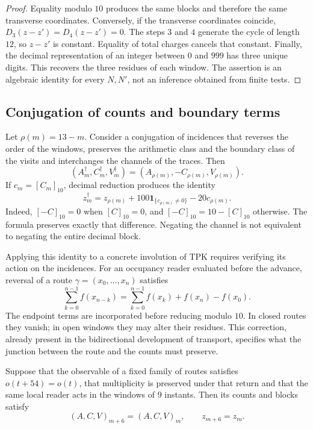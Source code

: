 \begin{proof}
Equality modulo \(10\) produces the same blocks and therefore
the same transverse coordinates. Conversely, if the transverse
coordinates coincide, \(D_3(z-z')=D_4(z-z')=0\). The steps
\(3\) and \(4\) generate the cycle of length \(12\), so
\(z-z'\) is constant. Equality of total charges cancels that
constant. Finally, the decimal representation of an integer between
\(0\) and \(999\) has three unique digits. This recovers the
three residues of each window. The assertion is an algebraic identity
for every \(N,N'\), not an inference obtained from finite tests.
\end{proof}

\subsection{Conjugation of counts and boundary terms}
\label{x_reciprocidad:subsec:registro-conjugacion-incidencial}

Let \(\rho(m)=13-m\). Consider a conjugation of incidences
that reverses the order of the windows, preserves the arithmetic class and the
boundary class of the visits and interchanges the channels of the traces.
Then
\[
 (A_m^\dagger,C_m^\dagger,V_m^\dagger)
 =(A_{\rho(m)},-C_{\rho(m)},V_{\rho(m)}).
\]
If \(c_m=[C_m]_{10}\), decimal reduction produces the identity
\begin{equation}
 z_m^\dagger=z_{\rho(m)}
       +100\mathbf1_{\{c_{\rho(m)}\ne0\}}-20c_{\rho(m)}.
 \label{x_reciprocidad:eq:registro-conjugacion-decimal}
\end{equation}
Indeed, \([-C]_{10}=0\) when \([C]_{10}=0\), and
\([-C]_{10}=10-[C]_{10}\) otherwise. The formula preserves
exactly that difference. Negating the channel is not equivalent to negating
the entire decimal block.

Applying this identity to a concrete involution of TPK requires
verifying its action on the incidences. For an occupancy reader
evaluated before the advance, reversal of a route
\(\gamma=(x_0,\ldots,x_n)\) satisfies
\[
 \sum_{k=0}^{n-1}f(x_{n-k})
 =\sum_{k=0}^{n-1}f(x_k)+f(x_n)-f(x_0).
\]
The endpoint terms are incorporated before reducing modulo
\(10\). In closed routes they vanish; in open windows they may
alter their residues. This correction, already present in the bidirectional
development of transport, specifies what the junction
between the route and the counts must preserve.

\begin{proposition}
Suppose that the observable of a fixed family of routes satisfies
\(o(t+54)=o(t)\), that multiplicity is preserved under that return
and that the same local reader acts in the windows of \(9\) instants.
Then its counts and blocks satisfy
\[
 (A,C,V)_{m+6}=(A,C,V)_m,\qquad z_{m+6}=z_m.
\]
\end{proposition}

